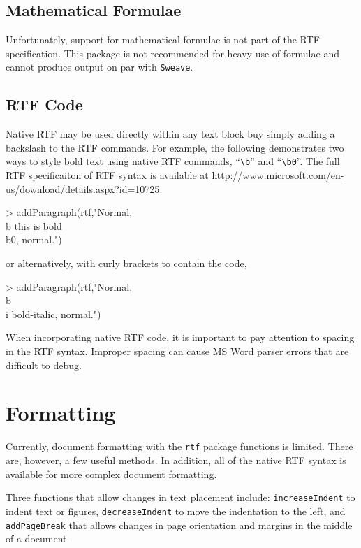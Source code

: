 \documentclass[11pt,letterpaper]{article}
\begin{document}
\subsection{Mathematical Formulae}
Unfortunately, support for mathematical formulae is not part of the RTF specification.  This package is not recommended for heavy use of formulae and cannot produce output on par with \texttt{Sweave}.


\subsection{RTF Code}
Native RTF may be used directly within any text block buy simply adding a backslash to the RTF commands.  For example, the following demonstrates two ways to style bold text using native RTF commands, ``\texttt{\textbackslash b}'' and ``\texttt{\textbackslash b0}''.  The full RTF specificaiton of RTF syntax is available at \url{http://www.microsoft.com/en-us/download/details.aspx?id=10725}.

\begin{Schunk}
\begin{Sinput}
> addParagraph(rtf,"Normal, \\b this is bold\\b0, normal.\n")
\end{Sinput}
\end{Schunk}

or alternatively, with curly brackets to contain the code,
\begin{Schunk}
\begin{Sinput}
> addParagraph(rtf,"Normal, {\\b\\i bold-italic}, normal.\n")
\end{Sinput}
\end{Schunk}

When incorporating native RTF code, it is important to pay attention to spacing in the RTF syntax.  Improper spacing can cause MS Word parser errors that are difficult to debug.


\section{Formatting}
Currently, document formatting with the \texttt{rtf} package functions is limited.  There are, however, a few useful methods.  In addition, all of the native RTF syntax is available for more complex document formatting.

Three functions that allow changes in text placement include: \texttt{increaseIndent} to indent text or figures, \texttt{decreaseIndent} to move the indentation to the left, and \texttt{addPageBreak} that allows changes in page orientation and margins in the middle of a document.
\end{document}
